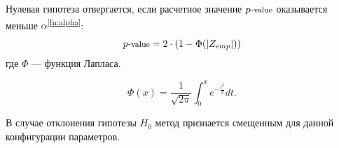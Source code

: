 \bigskip

Нулевая гипотеза отвергается, если расчетное значение $p\text{-}\text{\textsmaller{value}}$ оказывается меньше $\alpha$\textsuperscript{\ref{fn:alpha}}:
\begin{equation}
    p\text{-}\text{\textsmaller{value}} = 2 \cdot \left(1 - \Phi(|Z_{emp}|)\right)
\end{equation}
где $\Phi$ --- функция Лапласа.

\begin{equation}
    \Phi(x) = \frac{1}{\sqrt{2\pi}} \int_{0}^{x} e^{-\frac{t^2}{2}} dt.
\end{equation}

В случае отклонения гипотезы $H_0$ метод признается смещенным для данной конфигурации параметров.